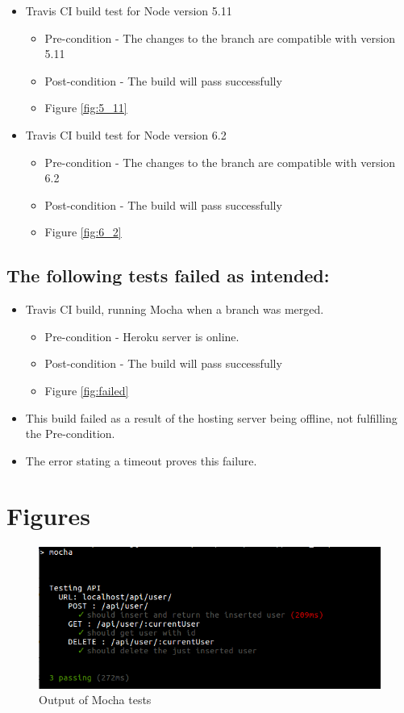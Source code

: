\documentclass{article}
\begin{document}
\begin{itemize}
\item Travis CI build test for Node version 5.11
	\begin{itemize}
	\item Pre-condition - The changes to the branch are compatible with version 5.11
	\item Post-condition - The build will pass successfully 
	\item Figure \ref{fig:5_11}
	\end{itemize}	
	
\item Travis CI build test for Node version 6.2
	\begin{itemize}
	\item Pre-condition - The changes to the branch are compatible with version 6.2
	\item Post-condition - The build will pass successfully 
	\item Figure \ref{fig:6_2}
	\end{itemize}	
\end{itemize}

\cleardoublepage
\subsection{The following tests failed as intended:}
\begin{itemize}
	\item Travis CI build, running Mocha when a branch was merged.
	\begin{itemize}
	\item Pre-condition - Heroku server is online.
	\item Post-condition - The build will pass successfully 
	\item Figure \ref{fig:failed}
	\end{itemize}
	\item This build failed as a result of the hosting server being offline, not fulfilling the Pre-condition. 
	\item The error stating a timeout proves this failure.
\end{itemize}

\cleardoublepage
\section{Figures}
\begin{figure}[H]
  \centering
      \includegraphics[width=\textwidth]{images/tests.png}
  \caption{Output of Mocha tests}
  \label{fig:MochaTests}
\end{figure}
\end{document}
